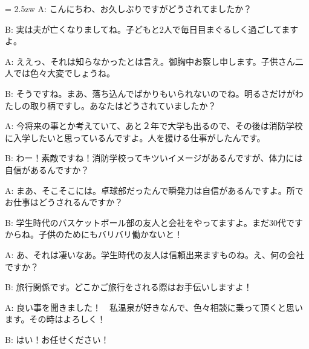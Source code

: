 \documentclass[11pt]{amsart}
\title{}
\author{}
\newenvironment{hangall}[1]{\hangindent = 2.5zw\everypar{\hangindent = 2.5zw}}{}
\begin{document}
\maketitle
\begin{hangall}{}%
A: こんにちわ、お久しぶりですがどうされてましたか？

B: 実は夫が亡くなりましてね。子どもと2人で毎日目まぐるしく過ごしてますよ。

A: ええっ、それは知らなかったとは言え。御胸中お察し申します。子供さん二人では色々大変でしょうね。

B: そうですね。まあ、落ち込んでばかりもいられないのでね。明るさだけがわたしの取り柄ですし。あなたはどうされていましたか？

A: 今将来の事とか考えていて、あと２年で大学も出るので、その後は消防学校に入学したいと思っているんですよ。人を援ける仕事がしたんです。

B: わー！素敵ですね！消防学校ってキツいイメージがあるんですが、体力には自信があるんですか？

A: まあ、そこそこには。卓球部だったんで瞬発力は自信があるんですよ。所でお仕事はどうされるんですか？

B: 学生時代のバスケットボール部の友人と会社をやってますよ。まだ30代ですからね。子供のためにもバリバリ働かないと！

A: あ、それは凄いなあ。学生時代の友人は信頼出来ますものね。え、何の会社ですか？

B: 旅行関係です。どこかご旅行をされる際はお手伝いしますよ！

A: 良い事を聞きました！　私温泉が好きなんで、色々相談に乗って頂くと思います。その時はよろしく！

B: はい！お任せください！
\end{hangall}
\end{document}

